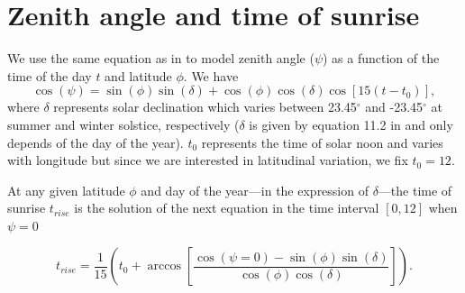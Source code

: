 \documentclass[12pt]{article}
\date{\vspace{-5ex}}
\begin{document}
\maketitle 


\section{Zenith angle and time of sunrise}
We use the same equation as in \citet{Campbell2012} to model zenith angle ($\psi$) as a function of the time of the day $t$ and latitude $\phi$. 
We have
\begin{equation}  \label{eq:psi}
\cos(\psi) = \sin(\phi) \sin(\delta) + \cos(\phi) \cos(\delta) \cos[15 (t- t_0)], 
\end{equation}
where $\delta$ represents solar declination which varies between 23.45$^\circ$ and  -23.45$^\circ$ at summer and winter solstice, respectively ($\delta$ is given by equation 11.2 in \citet{Campbell2012} and only depends of the day of the year). 
$t_0$ represents the time of solar noon and varies with longitude but since we are interested in latitudinal variation, we fix $t_0 = 12$.  

At any given latitude $\phi$ and day of the year---in the expression of $\delta$---the time of sunrise $t_{rise}$ is the solution of the next equation in the time interval $[0,12]$ when $\psi = 0$

\begin{equation}
t_{rise} =  \frac{1}{15} \left( t_0 +  \arccos \left[ \frac{\cos(\psi = 0) - \sin(\phi) \sin(\delta)}{\cos(\phi) \cos(\delta)} \right] \right).
\end{equation}


\end{document}

